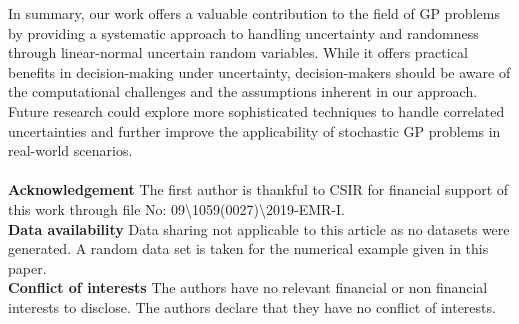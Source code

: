  \par In summary, our work offers a valuable contribution to the field of GP problems by providing a systematic approach to handling uncertainty and randomness through linear-normal uncertain random variables. While it offers practical benefits in decision-making under uncertainty, decision-makers should be aware of the computational challenges and the assumptions inherent in our approach. Future research could explore more sophisticated techniques to handle correlated uncertainties and further improve the applicability of stochastic GP problems in real-world scenarios.\\\\
{\small \textbf{Acknowledgement }The first author is thankful to CSIR for financial support of this work through file No: 09\textbackslash 1059(0027)\textbackslash 2019-EMR-I.}
\\
\textbf{Data availability } Data sharing not applicable to this article as no datasets were generated. A random data set is taken for the numerical example given in this paper.\\
\textbf{Conflict of interests} The authors have no relevant financial or non financial interests to disclose. The authors
declare that they have no conflict of interests.
